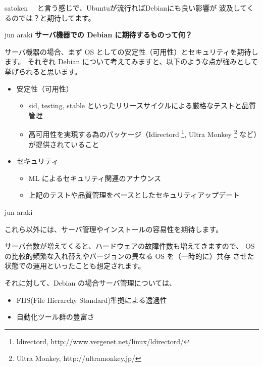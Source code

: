 \documentclass[cjk,dvipdfmx,12pt]{beamer}
\begin{document}
\begin{frame}{satoken}
　と言う感じで、Ubuntuが流行ればDebianにも良い影響が
波及してくるのでは？と期待してます。


\end{frame}\begin{frame}{jun araki}
\textbf{サーバ機器での Debian に期待するものって何？}

サーバ機器の場合、まず OS としての安定性（可用性）とセキュリティを期待します。
それぞれ Debian について考えてみますと、以下のような点が強みとして挙げられると思います。

	    \begin{itemize}
	     \item  安定性（可用性）
		    \begin{itemize}
		     \item  sid, testing, stable といったリリースサイクルによる厳格なテストと品質管理
		     \item  高可用性を実現する為のパッケージ（Idirectord
			    \footnote{ldirectord, \url{http://www.vergenet.net/linux/ldirectord/}},
			    Ultra Monkey
			    \footnote{Ultra Monkey, http://ultramonkey.jp/} など）が提供されていること
		    \end{itemize}

	     \item  セキュリティ
	     \begin{itemize}
	      \item  ML によるセキュリティ関連のアナウンス
	      \item  上記のテストや品質管理をベースとしたセキュリティアップデート
	     \end{itemize}
	    \end{itemize}

\end{frame}\begin{frame}{jun araki}

 これら以外には、サーバ管理やインストールの容易性を期待します。


 サーバ台数が増えてくると、ハードウェアの故障件数も増えてきますので、
 OS の比較的頻繁な入れ替えやバージョンの異なる OS を（一時的に）共存
 させた状態での運用といったことも想定されます。

 それに対して、Debian の場合サーバ管理については、

	    \begin{itemize}
	     \item  FHS(File Hierarchy Standard)準拠による透過性
	     \item  自動化ツール群の豊富さ
	    \end{itemize}


\end{frame}
\end{document}
